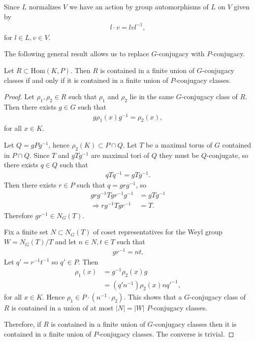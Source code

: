 Since $L$ normalizes $V$ we have an action by group automorphisms of $L$ on $V$ given by
\begin{align} \label{laction} l \cdot v = lvl^{-1}, \end{align}
for $l \in L, v \in V$.


The following general result allows us to replace $G$-conjugacy with $P$-conjugacy.
\begin{lemma} Let $R \subset \mathrm{Hom}(K, P)$. Then $R$ is contained in a finite union of $G$-conjugacy classes if and only if it is contained in a finite union of $P$-conjugacy classes.
  \label{lem:GPconj}
\end{lemma}
\begin{proof}
	Let $\rho_1, \rho_2 \in R$ such that $\rho_1$ and $\rho_2$ lie in the same $G$-conjugacy class of $R$. Then there exists $g\in G$ such that
	\begin{align*}
		g \rho_1(x) g^{-1} = \rho_2(x),
	\end{align*}
for all $x \in K$.
	
	Let $Q = gPg^{-1}$, hence $\rho_2(K) \subset P \cap Q$.
	Let $T$ be a maximal torus of $G$ contained in $P\cap Q$. Since $T$ and $gTg^{-1}$ are maximal tori of $Q$ they must be $Q$-conjugate, so there exists $q\in Q$ such that
	\begin{align*}
		qTq^{-1} = gTg^{-1}.
	\end{align*}
	Then there exists $r\in P$ such that $q = grg^{-1}$, so
	\begin{align*}
		grg^{-1}Tgr^{-1}g^{-1} &= gTg^{-1} \\
		\Rightarrow rg^{-1}Tgr^{-1} &= T.
	\end{align*}
	Therefore $gr^{-1} \in N_G(T)$. 

	Fix a finite set $N \subset N_G(T)$ of coset representatives for the Weyl group $W = N_G(T)/T$ and let $n \in N, t \in T$ such that
	\begin{align*}
		gr^{-1} = nt.
	\end{align*}
	Let $q' = r^{-1}t^{-1}$ so $q' \in P$. Then
	\begin{align*}
		\rho_1(x) &= g^{-1} \rho_2(x) g\\
		&= (q'n^{-1}) \rho_2(x) nq'^{-1},
	\end{align*}
	for all $x \in K$. Hence $\rho_1\in P\cdot(n^{-1}\cdot \rho_2)$.
	This shows 
	that a $G$-conjugacy class of $R$ is contained in a union of at most $|N| = |W|$ $P$-conjugacy classes.

	Therefore, if $R$ is contained in a finite union of $G$-conjugacy classes then it is contained in a finite union of $P$-conjugacy classes. The converse is trivial.
\end{proof}


